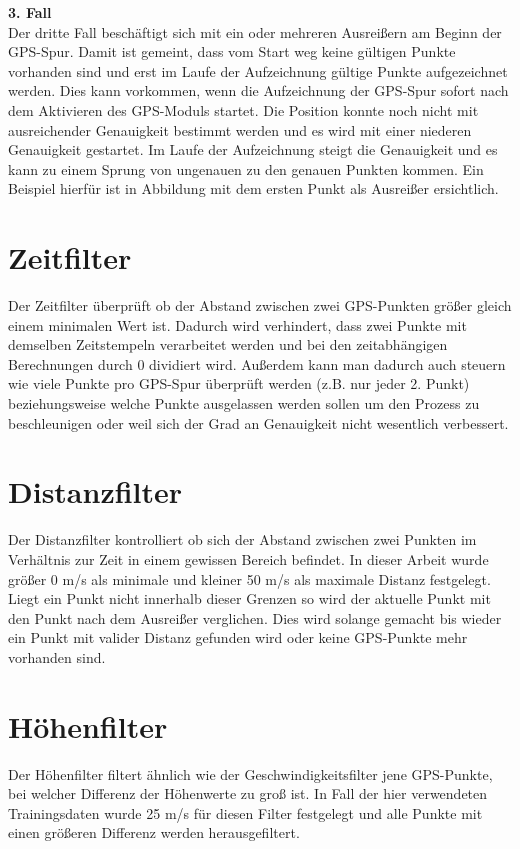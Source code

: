 
\textbf{3. Fall}\\
Der dritte Fall beschäftigt sich mit ein oder mehreren Ausreißern am Beginn der GPS-Spur. Damit ist gemeint, dass vom Start weg keine gültigen Punkte vorhanden sind und erst im Laufe der Aufzeichnung gültige Punkte aufgezeichnet werden. Dies kann vorkommen, wenn die Aufzeichnung der GPS-Spur sofort nach dem Aktivieren des GPS-Moduls startet. Die Position konnte noch nicht mit ausreichender Genauigkeit bestimmt werden und es wird mit einer niederen Genauigkeit gestartet. Im Laufe der Aufzeichnung steigt die Genauigkeit und es kann zu einem Sprung von ungenauen zu den genauen Punkten kommen. Ein Beispiel hierfür ist in Abbildung  mit dem ersten Punkt als Ausreißer ersichtlich.


\section{Zeitfilter}
Der Zeitfilter überprüft ob der Abstand zwischen zwei GPS-Punkten größer gleich einem minimalen Wert ist. Dadurch wird verhindert, dass zwei Punkte mit demselben Zeitstempeln verarbeitet werden und bei den zeitabhängigen Berechnungen durch 0 dividiert wird. Außerdem kann man dadurch auch steuern wie viele Punkte pro GPS-Spur überprüft werden  (z.B. nur jeder 2. Punkt) beziehungsweise welche Punkte ausgelassen werden sollen um den Prozess zu beschleunigen oder weil sich der Grad an Genauigkeit nicht wesentlich verbessert.

\section{Distanzfilter}
Der Distanzfilter kontrolliert ob sich der Abstand zwischen zwei Punkten im Verhältnis zur Zeit in einem gewissen Bereich befindet. In dieser Arbeit wurde größer 0 m/s als minimale und kleiner 50 m/s als maximale Distanz festgelegt. Liegt ein Punkt nicht innerhalb dieser Grenzen so wird der aktuelle Punkt mit den Punkt nach dem Ausreißer verglichen. Dies wird solange gemacht bis wieder ein Punkt mit valider Distanz gefunden wird oder keine GPS-Punkte mehr vorhanden sind.

\section{Höhenfilter}
Der Höhenfilter filtert ähnlich wie der Geschwindigkeitsfilter jene GPS-Punkte, bei welcher Differenz der Höhenwerte zu groß ist. In Fall der hier verwendeten Trainingsdaten wurde 25 m/s  für diesen Filter festgelegt und alle Punkte mit einen größeren Differenz werden herausgefiltert.

